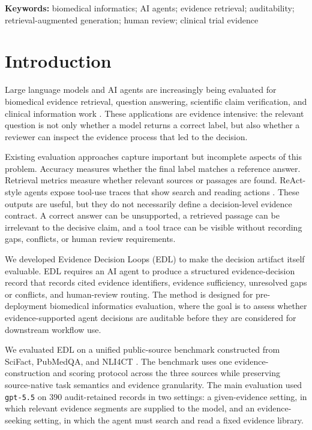 \documentclass[11pt,a4paper]{article}
\begin{document}
\textbf{Keywords:} biomedical informatics; AI agents; evidence retrieval; auditability; retrieval-augmented generation; human review; clinical trial evidence

\section{Introduction}

Large language models and AI agents are increasingly being evaluated for biomedical evidence retrieval, question answering, scientific claim verification, and clinical information work \cite{moor2023foundation,singhal2023clinical,rajpurkar2022health}. These applications are evidence intensive: the relevant question is not only whether a model returns a correct label, but also whether a reviewer can inspect the evidence process that led to the decision.

Existing evaluation approaches capture important but incomplete aspects of this problem. Accuracy measures whether the final label matches a reference answer. Retrieval metrics measure whether relevant sources or passages are found. ReAct-style agents expose tool-use traces that show search and reading actions \cite{yao2023react}. These outputs are useful, but they do not necessarily define a decision-level evidence contract. A correct answer can be unsupported, a retrieved passage can be irrelevant to the decisive claim, and a tool trace can be visible without recording gaps, conflicts, or human review requirements.

We developed Evidence Decision Loops (EDL) to make the decision artifact itself evaluable. EDL requires an AI agent to produce a structured evidence-decision record that records cited evidence identifiers, evidence sufficiency, unresolved gaps or conflicts, and human-review routing. The method is designed for pre-deployment biomedical informatics evaluation, where the goal is to assess whether evidence-supported agent decisions are auditable before they are considered for downstream workflow use.

We evaluated EDL on a unified public-source benchmark constructed from SciFact, PubMedQA, and NLI4CT \cite{wadden2020scifact,jin2019pubmedqa,jullien2023nli4ct}. The benchmark uses one evidence-construction and scoring protocol across the three sources while preserving source-native task semantics and evidence granularity. The main evaluation used \texttt{gpt-5.5} on 390 audit-retained records in two settings: a given-evidence setting, in which relevant evidence segments are supplied to the model, and an evidence-seeking setting, in which the agent must search and read a fixed evidence library.
\end{document}
